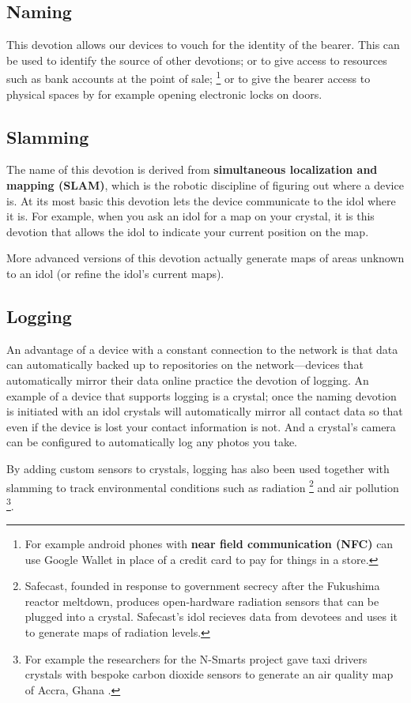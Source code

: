 \subsection{Naming} 
%
This devotion allows our devices to vouch for the identity of the bearer. This can be used to identify the source of other devotions; or to give access to resources such as bank accounts at the point of sale;%
\footnote{For example android phones with \textbf{near field communication (NFC)} can use Google Wallet in place of a credit card to pay for things in a store.}
or to give the bearer access to physical spaces by for example opening electronic locks on doors.

\subsection{Slamming} 
%
The name of this devotion is derived from \textbf{simultaneous localization and mapping (SLAM)}, which is the robotic discipline of figuring out where a device is. At its most basic this devotion lets the device communicate to the idol where it is. For example, when you ask an idol for a map on your crystal, it is this devotion that allows the idol to indicate your current position on the map.

More advanced versions of this devotion actually generate maps of areas unknown to an idol (or refine the idol's current maps).

\subsection{Logging} 
%
An advantage of a device with a constant connection to the network is that data can automatically backed up to repositories on the network---devices that automatically mirror their data online practice the devotion of logging. 
An example of a device that supports logging is a crystal; once the naming devotion is initiated with an idol crystals will automatically mirror all contact data so that even if the device is lost your contact information is not. 
And a crystal's camera can be configured to automatically log any photos you take.

By adding custom sensors to crystals, logging has also been used together with slamming to track environmental conditions such as radiation%
\footnote{Safecast, founded in response to government secrecy after the Fukushima reactor meltdown, produces open-hardware radiation sensors that can be plugged into a crystal. Safecast's idol recieves data from devotees and uses it to generate maps of radiation levels.}
and air pollution%
\footnote{For example the researchers for the N-Smarts project gave taxi drivers crystals with bespoke carbon dioxide sensors to generate an air quality map of Accra, Ghana \citep{n-smarts}.}.

